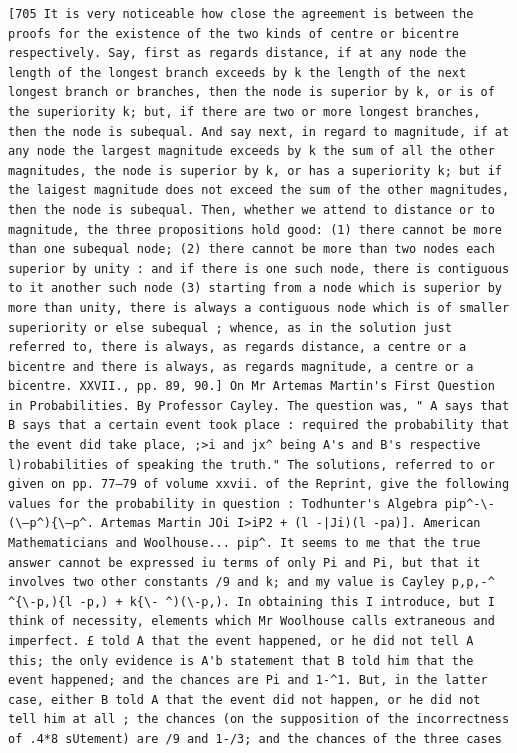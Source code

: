 \documentclass[11pt,a4paper]{book}
\begin{document}
\newpage
\setcounter{page}{600}
\begin{verbatim}
[705 It is very noticeable how close the agreement is between the proofs for the existence of the two kinds of centre or bicentre respectively. Say, first as regards distance, if at any node the length of the longest branch exceeds by k the length of the next longest branch or branches, then the node is superior by k, or is of the superiority k; but, if there are two or more longest branches, then the node is subequal. And say next, in regard to magnitude, if at any node the largest magnitude exceeds by k the sum of all the other magnitudes, the node is superior by k, or has a superiority k; but if the laigest magnitude does not exceed the sum of the other magnitudes, then the node is subequal. Then, whether we attend to distance or to magnitude, the three propositions hold good: (1) there cannot be more than one subequal node; (2) there cannot be more than two nodes each superior by unity : and if there is one such node, there is contiguous to it another such node (3) starting from a node which is superior by more than unity, there is always a contiguous node which is of smaller superiority or else subequal ; whence, as in the solution just referred to, there is always, as regards distance, a centre or a bicentre and there is always, as regards magnitude, a centre or a bicentre. XXVII., pp. 89, 90.] On Mr Artemas Martin's First Question in Probabilities. By Professor Cayley. The question was, " A says that B says that a certain event took place : required the probability that the event did take place, ;>i and jx^ being A's and B's respective l)robabilities of speaking the truth." The solutions, referred to or given on pp. 77—79 of volume xxvii. of the Reprint, give the following values for the probability in question : Todhunter's Algebra pip^-\- (\—p^){\—p^. Artemas Martin JOi I>iP2 + (l -|Ji)(l -pa)]. American Mathematicians and Woolhouse... pip^. It seems to me that the true answer cannot be expressed iu terms of only Pi and Pi, but that it involves two other constants /9 and k; and my value is Cayley p,p,-^ ^{\-p,){l -p,) + k{\- ^)(\-p,). In obtaining this I introduce, but I think of necessity, elements which Mr Woolhouse calls extraneous and imperfect. £ told A that the event happened, or he did not tell A this; the only evidence is A'b statement that B told him that the event happened; and the chances are Pi and 1-^1. But, in the latter case, either B told A that the event did not happen, or he did not tell him at all ; the chances (on the supposition of the incorrectness of .4*8 sUtement) are /9 and 1-/3; and the chances of the three cases 
\end{verbatim}
\clearpage
\end{document}
